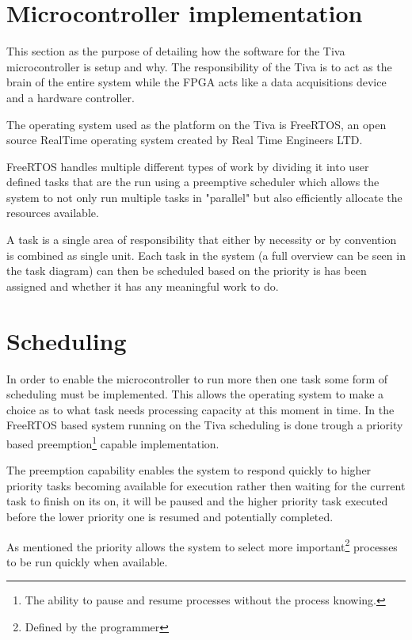 \documentclass[../../../main]{subfiles}
\begin{document}
\section{Microcontroller implementation}

This section as the purpose of detailing how the software for the Tiva microcontroller is setup and why. The responsibility of the Tiva is to act as the brain of the entire system while the FPGA acts like a data acquisitions device and a hardware controller. 

The operating system used as the platform on the Tiva is FreeRTOS, an open source RealTime operating system created by Real Time Engineers LTD.

FreeRTOS handles multiple different types of work by dividing it into user defined tasks that are the run using a preemptive scheduler which allows the system to not only run multiple tasks in "parallel" but also efficiently allocate the resources available.


A task is a single area of responsibility that either by necessity or by convention is combined as single unit. Each task in the system (a full overview can be seen in the task diagram) can then be scheduled based on the priority is has been assigned and whether it has any meaningful work to do. 


\section{Scheduling}

In order to enable the microcontroller to run more then one task some form of scheduling must be implemented. This allows the operating system to make a choice as to what task needs processing capacity at this moment in time. In the FreeRTOS based system running on the Tiva scheduling is done trough a priority based preemption\footnote{The ability to pause and resume processes without the process knowing.} capable implementation.

The preemption capability enables the system to respond quickly to higher priority tasks becoming available for execution rather then waiting for the current task to finish on its on, it will be paused and the higher priority task executed before the lower priority one is resumed and potentially completed.
 
As mentioned the priority allows the system to select more important\footnote{Defined by the programmer} processes to be run quickly when available.  
\end{document}
